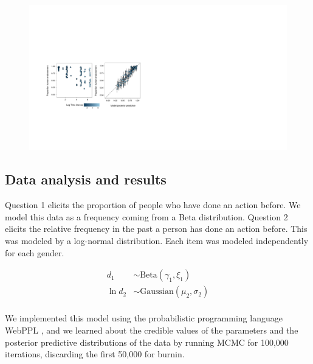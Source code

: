 \documentclass[10pt,letterpaper]{article}
\begin{document}
\begin{figure}[t]
\centering
  \includegraphics[width=\textwidth]{tj-scatters1}
  \caption{}
  \label{fig:tjScatters}
\end{figure}


\subsection{Data analysis and results}

Question 1 elicits the proportion of people who have done an action before. 
We model this data as a frequency coming from a Beta distribution. 
Question 2 elicits the relative frequency in the past a person has done an action before.
This was modeled by a log-normal distribution. 
Each item was modeled independently for each gender.
%
\begin{minipage}{0.5 \textwidth} \small
\begin{align*}
d_{1} &\sim \text{Beta}(\gamma_{1}, \xi_{1}) \\
\ln d_{2} &\sim \text{Gaussian}(\mu_{2}, \sigma_{2}) \\
\end{align*}
\end{minipage}
%
We implemented this model using the probabilistic programming language WebPPL \cite{dippl}, and we learned about the credible values of the parameters and the posterior predictive distributions of the data by running MCMC for 100,000 iterations, discarding the first 50,000 for burnin.
%
\end{document}
